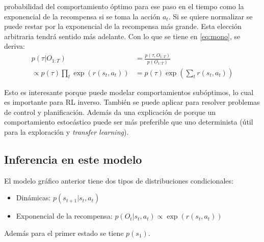 probabilidad del comportamiento óptimo para ese paso en el tiempo como la exponencial de la
recompensa si se toma la acción $a_t$. Si se quiere normalizar se puede restar por la
exponencial de la recompensa más grande. Esta elección arbitraria tendrá sentido más
adelante. Con lo que se tiene en \ref{eq:mono}, se deriva:
\begin{align}
    p ( \tau | O _ { 1 : T } ) &= \frac { p ( \tau , O _ { 1 : T } ) } { p ( O _ { 1 : T } ) }\\
    \propto p ( \tau ) \prod _ { t } \operatorname { exp } \left( r ( s _ { t } , a _ { t } )
\right) &= p ( \tau ) \operatorname { exp } \left( \sum _ { t } r ( s _ { t } , a _ { t } )
\right)
\end{align}

 Esto es interesante porque puede modelar comportamientos subóptimos, lo cual es importante
 para RL inverso. También se puede aplicar para resolver problemas de control y
 planificación. Además da una explicación de porque un comportamiento estocástico puede
 ser más preferible que uno determinista (útil para la exploración y \textit{transfer
 learning}).

 \subsection{Inferencia en este modelo}%
 \label{sub:inferencia_en_este_modelo}
 
 El modelo gráfico anterior tiene dos tipos de distribuciones condicionales:
 \begin{itemize}
     \item Dinámicas: $p(s_{t+1}|s_t,a_t)$ 
     \item Exponencial de la recompensa: $p(O_t|s_t,a_t)\propto \exp(r(s_t,a_t))$
 \end{itemize}
 Además para el primer estado se tiene $p(s_1)$.

